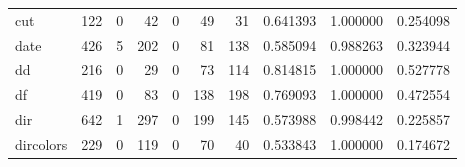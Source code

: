 \begin{tabular}{lrrrrrrrrr}
cut       &                                                122 &                                                  0 &                                                 42 &                                                  0 &                                                 49 &                                                 31 &                                           0.641393 &                               1.000000 &                             0.254098 \\
date      &                                                426 &                                                  5 &                                                202 &                                                  0 &                                                 81 &                                                138 &                                           0.585094 &                               0.988263 &                             0.323944 \\
dd        &                                                216 &                                                  0 &                                                 29 &                                                  0 &                                                 73 &                                                114 &                                           0.814815 &                               1.000000 &                             0.527778 \\
df        &                                                419 &                                                  0 &                                                 83 &                                                  0 &                                                138 &                                                198 &                                           0.769093 &                               1.000000 &                             0.472554 \\
dir       &                                                642 &                                                  1 &                                                297 &                                                  0 &                                                199 &                                                145 &                                           0.573988 &                               0.998442 &                             0.225857 \\
dircolors &                                                229 &                                                  0 &                                                119 &                                                  0 &                                                 70 &                                                 40 &                                           0.533843 &                               1.000000 &                             0.174672 \\

\end{tabular}
